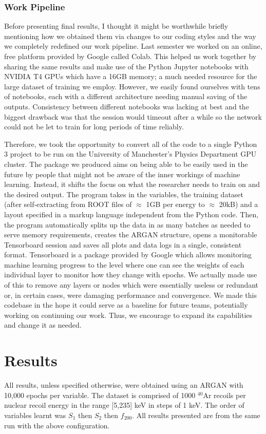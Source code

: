 \documentclass[11pt]{article} %
\begin{document}
\subsubsection{Work Pipeline}
Before presenting final results, I thought it might be worthwhile briefly mentioning how we obtained them via
changes to our coding styles and the way we completely redefined our work pipeline.
Last semester we worked on an online, free platform provided by Google called Colab.
This helped us work together by sharing the same results and make use of the Python Jupyter notebooks with NVIDIA T4 GPUs which have a 16GB memory;
a much needed resource for the large dataset of training we employ.
However, we easily found ourselves with tens of notebooks, each with a different architecture needing manual saving of the outputs.
Consistency between different notebooks was lacking at best and the biggest drawback was that the session would timeout after a while so the network could not
be let to train for long periods of time reliably.
\\
\par Therefore, we took the opportunity to convert all of the code to a single Python 3 project to be run on the University of Manchester's Physics Department GPU cluster.
The package we produced aims on being able to be easily used in the future by people that might not be aware of the inner workings of machine learning.
Instead, it shifts the focus on what the researcher needs to train on and the desired output.
The program takes in the variables, the training dataset (after self-extracting from ROOT files of $\approx$ 1GB per energy to $\approx$ 20kB)
and a layout specified in a markup language independent from the Python code.
Then, the program automatically splits up the data in as many batches as needed to serve memory requirements, creates the ARGAN structure, opens a monitorable
Tensorboard session and saves all plots and data logs in a single, consistent format.
Tensorboard is a package provided by Google which allows monitoring machine learning progress to the level
where one can see the weights of each individual layer to monitor how they change with epochs.
We actually made use of this to remove any layers or nodes which were essentially useless or redundant or,
 in certain cases, were damaging performance and convergence.
We made this codebase in the hope it could serve as a baseline for future teams,
 potentially working on continuing our work.
Thus, we encourage to expand its capabilities and change it as needed.
\section{Results}
All results, unless specified otherwise, were obtained using an ARGAN with 10,000 epochs per variable.
The dataset is comprised of 1000 $^{40}\mathrm{\text{Ar}}$ recoils per nuclear recoil energy in the range [5,235] keV in steps of 1 keV.
The order of variables learnt was $S_1$ then $S_2$ then $f_{200}$.
All results presented are from the same run with the above configuration.
\end{document}

